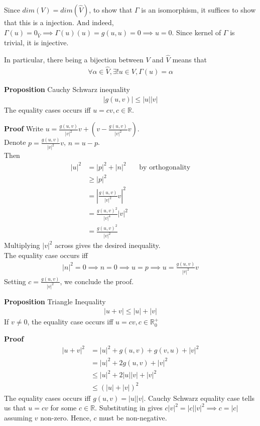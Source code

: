 \documentclass{article}
\begin{document}
Since $dim(V)=dim(\hat{V})$, to show that $\Gamma$ is an isomorphism, it suffices to show that this is a injection. And indeed, $\Gamma(u)=0_{\hat{V}}\implies \Gamma(u)(u)=g(u,u)=0\implies u=0$. Since kernel of $\Gamma$ is trivial, it is injective.

In particular, there being a bijection between $V$ and $\hat{V}$ means that 
\begin{align*}
\forall \alpha \in \hat{V}, \exists! u\in V, \Gamma(u) = \alpha
\end{align*}

\textbf{Proposition} Cauchy Schwarz inequality\\
\begin{align*}
	|g(u,v)| \leq |u||v|
\end{align*}
The equality cases occurs iff $u=cv, c\in \mathbb{R}$.

\textbf{Proof}
Write $u = \frac{g(u,v)}{|v|^2}v + (v-\frac{g(u,v)}{|v|^2}v)$.\\
Denote $p=\frac{g(u,v)}{|v|^2}v$, $n=u-p$.\\
Then
\begin{align*}
	|u|^2 &= |p|^2 + |n|^2 &&\text{by orthogonality}\\
	&\geq |p|^2\\
	&= \left\lvert \frac{g(u,v)}{|v|^2}v \right\rvert^2 \\
	&= \frac{g(u,v)^2}{|v|^4} |v|^2\\
	&= \frac{g(u,v)^2}{|v|^2}
\end{align*}
Multiplying $|v|^2$ across gives the desired inequality.\\
The equality case occurs iff
\begin{align*}
	|n|^2=0 \implies n=0\implies u=p \implies u = \frac{g(u,v)}{|v|^2}v
\end{align*}
Setting $c=\frac{g(u,v)}{|v|^2}$, we conclude the proof.

\textbf{Proposition} Triangle Inequality
\begin{align*}
	|u+v| \leq |u| + |v|
\end{align*}
If $v\neq 0$, the equality case occurs iff $u=cv, c\in \mathbb{R}^+_0$

\textbf{Proof}
\begin{align*}
	|u+v|^2 &= |u|^2 + g(u,v) + g(v,u) + |v|^2\\
	&= |u|^2 + 2g(u,v) + |v|^2\\
	&\leq |u|^2 + 2|u||v| + |v|^2\\
	&\leq (|u| + |v|)^2
\end{align*}
The equality cases occurs iff $g(u,v)=|u||v|$. Cauchy Schwarz equality case tells us that $u=cv$ for some $c\in \mathbb{R}$. Substituting in gives $c|v|^2=|c||v|^2\implies c=|c|$ assuming $v$ non-zero. Hence, $c$ must be non-negative.
\end{document}

